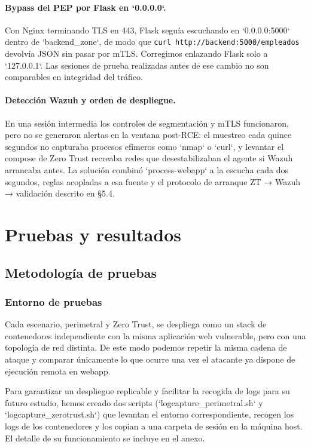 \documentclass[11pt,spanish,listoffigures,listoftables]{tfgetsinf}
\begin{document}
    \subsubsection{Bypass del PEP por Flask en `0.0.0.0`.} 
    Con Nginx terminando TLS en 443, Flask seguía escuchando en `0.0.0.0:5000` dentro de `backend\_zone`, de modo que \texttt{curl http://backend:5000/empleados} devolvía JSON sin pasar por mTLS. Corregimos enlazando Flask solo a `127.0.0.1`. Las sesiones de prueba realizadas antes de ese cambio no son comparables en integridad del tráfico.
    
    \subsubsection{Detección Wazuh y orden de despliegue.}
    En una sesión intermedia los controles de segmentación y mTLS funcionaron, pero no se generaron alertas en la ventana post-RCE: el muestreo cada quince segundos no capturaba procesos efímeros como `nmap` o `curl`, y levantar el compose de Zero Trust recreaba redes que desestabilizaban el agente si Wazuh arrancaba antes. La solución combinó `process-webapp` a la escucha cada dos segundos, reglas acopladas a esa fuente y el protocolo de arranque ZT → Wazuh → validación descrito en §5.4.


\chapter{Pruebas y resultados}

    \section{Metodología de pruebas}
        \subsection{Entorno de pruebas}

        Cada escenario, perimetral y Zero Trust, se despliega como un stack de contenedores independiente con la misma aplicación web vulnerable, pero con una topología de red distinta. De este modo podemos repetir la misma cadena de ataque y comparar únicamente lo que ocurre una vez el atacante ya dispone de ejecución remota en webapp.
        
        Para garantizar un despliegue replicable y facilitar la recogida de logs para su futuro estudio, hemos creado dos scripts (`logcapture\_perimetral.sh` y `logcapture\_zerotrust.sh`) que levantan el entorno correspondiente, recogen los logs de los contenedores y los copian a una carpeta de sesión en la máquina host. El detalle de su funcionamiento se incluye en el anexo.
        
\end{document}
